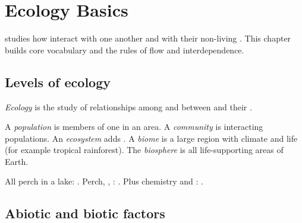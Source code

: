 \chapter{Ecology Basics}\label{ch:g6:ecology}

 studies how  interact with one another and with their
non-living . This chapter builds core vocabulary and the
rules of  flow and interdependence.

\section{Levels of ecology}

\begin{definition}[Ecology]\label{def:g6:ecology:def}
\emph{Ecology} is the study of relationships among
 and between  and their .
\end{definition}

\begin{definition}\label{def:g6:ecology:levels}
A \emph{population} is members of one  in an
area. A \emph{community} is interacting populations.
An \emph{ecosystem} adds . A
\emph{biome} is a large region with  climate
and life (for example tropical rainforest). The \emph{biosphere}
 is all life-supporting areas of Earth.
\end{definition}

\begin{example}[Lake]\label{ex:g6:ecology:lake}
All perch in a lake: . Perch, , : .
Plus  chemistry and : .
\end{example}

\section{Abiotic and biotic factors}

